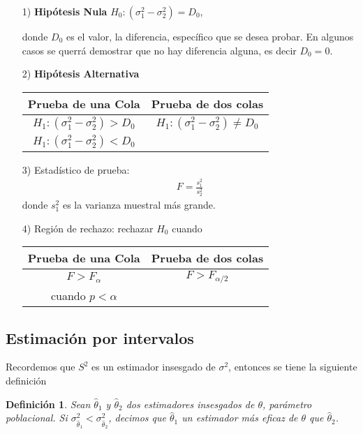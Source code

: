 \documentclass[a4paper]{report} %
\newtheorem{Def}{Definici\'on}[chapter]
\begin{document}
\begin{itemize}
\item[1) ] \textbf{Hip\'otesis Nula} $H_{0}:\left(\sigma^{2}_{1}-\sigma^{2}_{2}\right)=D_{0}$,\medskip

donde $D_{0}$ es el valor, la diferencia, espec\'ifico que se desea probar. En algunos casos se querr\'a demostrar que no hay diferencia alguna, es decir $D_{0}=0$.

\item[2) ] \textbf{Hip\'otesis Alternativa}
\begin{center}
\begin{tabular}{cc}\hline
\textbf{Prueba de una Cola} & \textbf{Prueba de dos colas}\\\hline
$H_{1}:\left(\sigma^{2}_{1}-\sigma^{2}_{2}\right)>D_{0}$ & $H_{1}:\left(\sigma^{2}_{1}-\sigma^{2}_{2}\right)\neq D_{0}$\\ 
$H_{1}:\left(\sigma^{2}_{1}-\sigma^{2}_{2}\right)<D_{0}$&\\
\end{tabular}
\end{center}
\item[3) ] Estad\'istico de prueba:
\begin{eqnarray}F=\frac{s_{1}^{2}}{s_{2}^{2}}\end{eqnarray}
donde $s_{1}^{2}$ es la varianza muestral m\'as grande.
\item[4) ] Regi\'on de rechazo: rechazar $H_{0}$ cuando
\begin{center}
\begin{tabular}{cc}\hline
\textbf{Prueba de una Cola} & \textbf{Prueba de dos colas}\\\hline
$F>F_{\alpha}$ & $F>F_{\alpha/2}$\\
 cuando $p<\alpha$&\\
\end{tabular}
\end{center}
\end{itemize}

\subsection{Estimaci\'on por intervalos}

Recordemos que $S^{2}$ es un estimador insesgado de $\sigma^{2}$, entonces se tiene la siguiente definici\'on 
\begin{Def}
Sean $\hat{\theta}_{1}$ y $\hat{\theta}_{2}$ dos estimadores insesgados de $\theta$, par\'ametro poblacional. Si $\sigma_{\hat{\theta}_{1}}^{2}<\sigma_{\hat{\theta}_{2}}^{2}$, decimos que $\hat{\theta}_{1}$ un estimador m\'as eficaz de $\theta$ que $\hat{\theta}_{2}$.
\end{Def}
\end{document}
